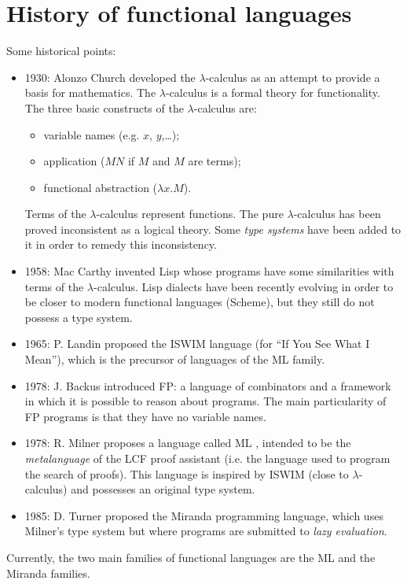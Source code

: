 \section{History of functional languages}

Some historical points:

\begin{itemize}
\item 1930: Alonzo Church developed the $\lambda$-calculus \cite{Church} as an attempt to
           provide a basis for mathematics. The $\lambda$-calculus is a
           formal theory for functionality.
    The three basic constructs of
           the $\lambda$-calculus are:
           \begin{itemize}
              \item variable names (e.g. $x$, $y$,\ldots);
              \item application ($MN$ if $M$ and $M$ are terms);
              \item functional abstraction ($\lambda x . M$).
           \end{itemize}
           Terms of the $\lambda$-calculus represent functions. The pure
           $\lambda$-calculus has been proved inconsistent as a logical theory.
           Some {\em type systems} have been added to it in order to remedy
           this inconsistency.
\item 1958: Mac Carthy invented Lisp \cite{MacCarthy} whose programs have some similarities
           with terms of the $\lambda$-calculus.
    Lisp dialects have been recently
           evolving in order to be closer to modern functional languages
           (Scheme), but they still do not possess a type system.
\item 1965: P. Landin proposed the ISWIM \cite{ISWIM} language (for ``If You See What I Mean''),
           which is the precursor of languages of the ML family.
\item 1978: J. Backus introduced FP: a language of combinators \cite{FP} and a framework
           in which it is possible to reason about programs.
The main particularity of FP programs is that they have no variable names.
\item 1978: R. Milner proposes a language called ML \cite{ML}, intended to be the
           {\em metalanguage} of the LCF proof assistant (i.e. the language
           used to program the search of proofs). This language is inspired
           by ISWIM (close to $\lambda$-calculus) and possesses an original
           type system.
\item 1985: D. Turner proposed the Miranda \cite{Miranda85} programming language, which uses
           Milner's type system but where programs are submitted to {\em
           lazy evaluation}.
\end{itemize}
Currently, the two main families of functional languages are the ML and the
Miranda families.

